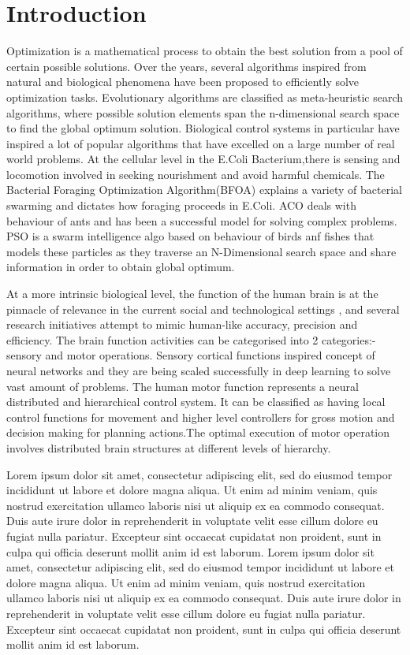\section{Introduction}

Optimization is a mathematical process to obtain the best solution from a pool of certain possible solutions. Over the years, several algorithms inspired from natural and biological phenomena have been proposed to efficiently solve optimization tasks. Evolutionary algorithms are classified as meta-heuristic search algorithms, where possible solution elements span the n-dimensional search space to find the global optimum solution.
Biological control systems in particular have inspired a lot of popular algorithms that have excelled on a large number of real world problems. At the cellular level in the E.Coli Bacterium,there is sensing and locomotion involved in seeking nourishment and avoid harmful chemicals. The Bacterial Foraging Optimization Algorithm(BFOA) explains a variety of bacterial swarming and dictates how foraging proceeds in E.Coli. ACO deals with behaviour of ants and has been a successful model for solving complex problems. PSO is a swarm intelligence algo based on behaviour of birds anf fishes that models these particles as they traverse an N-Dimensional search space and share information in order to obtain global optimum.

At a more intrinsic biological level, the function of the human brain is at the pinnacle of relevance in the current social and technological settings , and several research initiatives attempt to mimic human-like accuracy, precision and efficiency. The brain function activities can be categorised into 2 categories:- sensory and motor operations. Sensory cortical functions inspired concept of neural networks and they are being scaled successfully in deep learning to solve vast amount of problems. 
The human motor function represents a neural distributed and hierarchical control system. It can be classified as having local control functions for movement and higher level controllers for gross motion and decision making for planning actions.The optimal execution of motor operation involves distributed brain structures at different levels of hierarchy.

Lorem ipsum dolor sit amet, consectetur adipiscing elit, sed do eiusmod tempor incididunt ut labore et dolore magna aliqua. Ut enim ad minim veniam, quis nostrud exercitation ullamco laboris nisi ut aliquip ex ea commodo consequat. Duis aute irure dolor in reprehenderit in voluptate velit esse cillum dolore eu fugiat nulla pariatur. Excepteur sint occaecat cupidatat non proident, sunt in culpa qui officia deserunt mollit anim id est laborum.
Lorem ipsum dolor sit amet, consectetur adipiscing elit, sed do eiusmod tempor incididunt ut labore et dolore magna aliqua. Ut enim ad minim veniam, quis nostrud exercitation ullamco laboris nisi ut aliquip ex ea commodo consequat. Duis aute irure dolor in reprehenderit in voluptate velit esse cillum dolore eu fugiat nulla pariatur. Excepteur sint occaecat cupidatat non proident, sunt in culpa qui officia deserunt mollit anim id est laborum.

